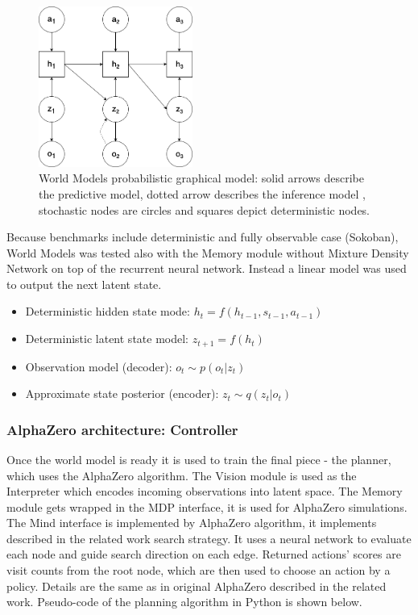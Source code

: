 \begin{figure}[H]
\includegraphics[width=0.45\textwidth,keepaspectratio]{figures/WorldModels/prob_graph_model.png}
\caption[World Models probabilistic graphical model]{World Models probabilistic graphical model: solid arrows describe the predictive model, dotted arrow describes the inference model , stochastic nodes are circles and squares depict deterministic nodes.}
\label{Fig.WorldModelsPHM}
\end{figure}

Because benchmarks include deterministic and fully observable case (Sokoban), World Models was tested also with the Memory module without Mixture Density Network on top of the recurrent neural network. Instead a linear model was used to output the next latent state.
\begin{itemize}
\item Deterministic hidden state mode:       $h_t = f(h_{t-1}, s_{t-1}, a_{t-1})$
\item Deterministic latent state model:      $z_{t+1} = f(h_t)$
\item Observation model (decoder):           $o_t \sim p(o_t|z_t)$
\item Approximate state posterior (encoder): $z_t \sim q(z_t|o_t)$
\end{itemize}


\subsubsection{AlphaZero architecture: Controller}
Once the world model is ready it is used to train the final piece - the planner, which uses the AlphaZero algorithm. The Vision module is used as the Interpreter which encodes incoming observations into latent space. The Memory module gets wrapped in the MDP interface, it is used for AlphaZero simulations. The Mind interface is implemented by AlphaZero algorithm, it implements described in the related work search strategy. It uses a neural network to evaluate each node and guide search direction on each edge. Returned actions' scores are visit counts from the root node, which are then used to choose an action by a policy. Details are the same as in original AlphaZero described in the related work. Pseudo-code of the planning algorithm in Python is shown below.

